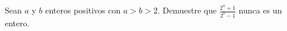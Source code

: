 Sean $a$ y $b$ enteros positivos con $a\gt b\gt 2$. Demuestre que $\frac{2^a+1}{2^b-1}$ nunca es un entero.